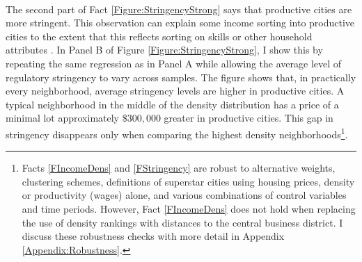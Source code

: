 \documentclass[12pt]{article}
\begin{document}
	\paragraph*{}
	The second part of Fact \ref{Figure:StringencyStrong} says that productive cities are more stringent. This observation can explain some income sorting into productive cities to the extent that this reflects sorting on skills or other household attributes \citep{diamond2016, citysizewagegap}. In Panel B of Figure \ref{Figure:StringencyStrong}, I show this by repeating the same regression as in Panel A while allowing the average level of regulatory stringency to vary across samples. The figure shows that, in practically every neighborhood, average stringency levels are higher in productive cities. A typical neighborhood in the middle of the density distribution has a price of a minimal lot approximately $\$300,000$ greater in productive cities. This gap in stringency disappears only when comparing the highest density neighborhoods\footnote{Facts \ref{FIncomeDens} and \ref{FStringency} are robust to alternative weights, clustering schemes, definitions of superstar cities using housing prices, density or productivity (wages) alone, and various combinations of control variables and time periods. However, Fact \ref{FIncomeDens} does not hold when replacing the use of density rankings with distances to the central business district. I discuss these robustness checks with more detail in Appendix \ref{Appendix:Robustness}.}.
\end{document}
